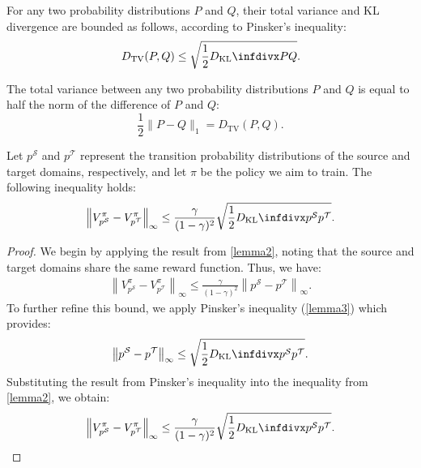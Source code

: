 \begin{lemma}
\label{lemma3}
For any two probability distributions $P$ and $Q$, their total variance and KL divergence are bounded as follows, according to Pinsker’s inequality:
\begin{equation} 
\label{eq-lemma3}
{D_{\mathrm{TV}}}(P, Q) \leq \sqrt{\frac{1}{2} \infdiv{P}{Q}}.
\end{equation}
\end{lemma}

\begin{lemma}
\label{lemma4}
The total variance between any two probability distributions $P$ and $Q$ is equal to half the norm of the difference of $P$ and $Q$:
\begin{equation}
    \frac{1}{2} \| P - Q \|_1 = {D_{\mathrm{TV}}}(P, Q).
\end{equation}
\end{lemma}


\begin{corollary} 
\label{corollary2}
Let $p^{\mathcal{S}}$ and $p^{\mathcal{T}}$ represent the transition probability distributions of the source and target domains, respectively, and let $\pi$ be the policy we aim to train. The following inequality holds:
\begin{equation} 
\label{eq-corollary2}
\begin{aligned}
\left\|V_{p^{\mathcal{S}}}^{\pi}-V_{p^{\mathcal{T}}}^{\pi}\right\|_{\infty} \leq \frac{\gamma}{(1-\gamma)^2} \sqrt{\frac{1}{2} \infdiv{p^{\mathcal{S}}}{p^{\mathcal{T}}}}.
\end{aligned}
\end{equation}
\end{corollary}

\begin{proof}
We begin by applying the result from \autoref{lemma2}, noting that the source and target domains share the same reward function. Thus, we have:
\begin{equation}
\begin{aligned}
\left\| V_{p^{\mathcal{S}}}^{\pi} - V_{p^{\mathcal{T}}}^{\pi} \right\|_{\infty} \leq \frac{\gamma}{(1-\gamma)^2} \left\| p^{\mathcal{S}} - p^{\mathcal{T}} \right\|_{\infty}.
\end{aligned}
\end{equation}
To further refine this bound, we apply Pinsker's inequality (\autoref{lemma3}) which provides:
\begin{equation}
\left\| p^{\mathcal{S}} - p^{\mathcal{T}} \right\|_{\infty} \leq \sqrt{\frac{1}{2} \infdiv{p^{\mathcal{S}}}{p^{\mathcal{T}}}}.
\end{equation}
Substituting the result from Pinsker's inequality into the inequality from \autoref{lemma2}, we obtain:
\begin{equation}
\left\| V_{p^{\mathcal{S}}}^{\pi} - V_{p^{\mathcal{T}}}^{\pi} \right\|_{\infty} \leq \frac{\gamma}{(1-\gamma)^2} \sqrt{\frac{1}{2} \infdiv{p^{\mathcal{S}}}{p^{\mathcal{T}}}}.
\end{equation}
\end{proof}



